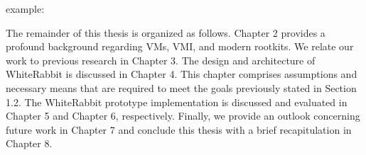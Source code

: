 example: 

The remainder of this thesis is organized as follows. Chapter 2 provides a profound
background regarding VMs, VMI, and modern rootkits. We relate our work to previous
research in Chapter 3. The design and architecture of WhiteRabbit is discussed in
Chapter 4. This chapter comprises assumptions and necessary means that are required
to meet the goals previously stated in Section 1.2. The WhiteRabbit prototype implementation
is discussed and evaluated in Chapter 5 and Chapter 6, respectively. Finally,
we provide an outlook concerning future work in Chapter 7 and conclude this thesis
with a brief recapitulation in Chapter 8.


